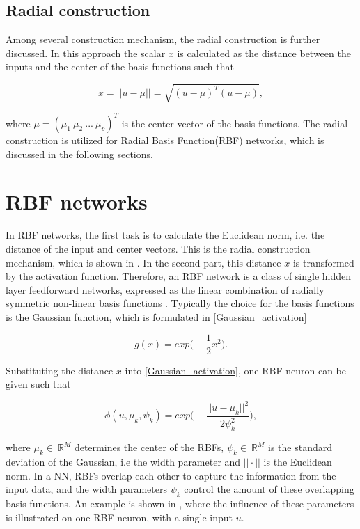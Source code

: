 \subsection{Radial construction}
\label{radial construction}

Among several construction mechanism, the radial construction is further discussed. In this approach the scalar $x$ is calculated as the distance between the inputs and the center of the basis functions such that 

 \begin{equation}
\label{radial_structure}
x = ||u- \mu|| = \sqrt{(u-\mu)^T (u-\mu)},
\end{equation}

where $\mu = (\mu_1 \ \mu_2 \ ... \ \mu_p)^T$ is the center vector of the basis functions. The radial construction is utilized for Radial Basis Function(RBF) networks, which is discussed in the following sections.


\section{RBF networks}
\label{Radial_basis_function_networks}

 In RBF networks, the first task is to calculate the Euclidean norm, i.e. the distance of the input and center vectors. This is the radial construction mechanism, which is shown in . In the second part, this distance $x$ is transformed by the activation function. Therefore, an RBF network is a class of single hidden layer feedforward networks, expressed as the linear combination of radially symmetric non-linear basis functions \cite{RBF_article}. Typically the choice for the basis functions is the Gaussian function, which is formulated in \eqref{Gaussian_activation} 

\begin{equation}
\label{Gaussian_activation}
g(x) = exp \Big(-\frac{1}{2}x^2\Big).
\end{equation}

Substituting the distance $x$ into \eqref{Gaussian_activation}, one RBF neuron can be given such that

 \begin{equation}
\label{Gaussian_activation1}
\phi(u,\mu_k, \psi_k) = exp \Big(-\frac{||u-\mu_k||^2}{2\psi_k^2}\Big), 
\end{equation}

where $\mu_k \in \: \mathbb{R}^{M}$ determines the center of the RBFs, $\psi_k \in \: \mathbb{R}^{M}$ is the standard deviation of the Gaussian, i.e the width parameter and $||\cdot||$ is the Euclidean norm. In a NN, RBFs overlap each other to capture the information from the input data, and the width parameters $\psi_k$ control the amount of these overlapping basis functions. An example is shown in , where the influence of these parameters is illustrated on one RBF neuron, with a single input $u$. 


